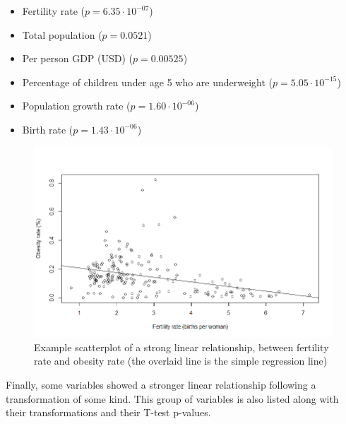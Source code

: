 \documentclass[oneside,12pt]{report}
\begin{document}
\begin{itemize}
\item Fertility rate (\begin{math}p=6.35\cdot10^{-07}\end{math})
\item Total population (\begin{math}p=0.0521\end{math})
\item Per person GDP (USD) (\begin{math}p=0.00525\end{math})
\item Percentage of children under age 5 who are underweight (\begin{math}p=5.05\cdot10^{-15}\end{math})
\item Population growth rate (\begin{math}p=1.60\cdot10^{-06}\end{math})
\item Birth rate (\begin{math}p=1.43\cdot10^{-06}\end{math})
\end{itemize}

\begin{figure}
\centering
\caption{Example scatterplot of a strong linear relationship, between fertility rate and obesity rate (the overlaid line is the simple regression line)}
\label{fig:fertility-obesity-scatter}
\includegraphics[width=\textwidth]{fertility-obesity-scatter.png}
\end{figure}

Finally, some variables showed a stronger linear relationship following a transformation of some kind. This group of variables is also listed along with their transformations and their T-test p-values.
\end{document}
